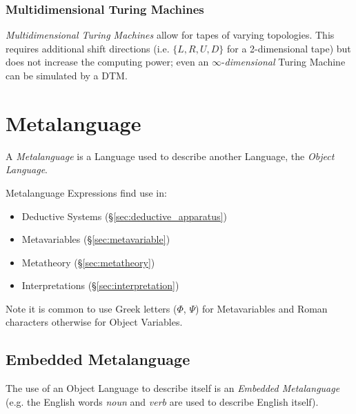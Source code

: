 \subsubsection{Multidimensional Turing Machines}

\emph{Multidimensional Turing Machines} allow for tapes of varying
topologies. This requires additional shift directions (i.e. $\{L, R, U,
D\}$ for a 2-dimensional tape) but does not increase the computing
power; even an $\infty$-\emph{dimensional} Turing Machine can be
simulated by a DTM.



\section{Metalanguage}\label{sec:metalanguage}

A \emph{Metalanguage} is a Language used to describe another Language,
the \emph{Object Language}.

Metalanguage Expressions find use in:
\begin{itemize}
    \item Deductive Systems (\S\ref{sec:deductive_apparatus})
    \item Metavariables (\S\ref{sec:metavariable})
    \item Metatheory (\S\ref{sec:metatheory})
    \item Interpretations (\S\ref{sec:interpretation})
\end{itemize}

Note it is common to use Greek letters ($\Phi$, $\Psi$) for
Metavariables and Roman characters otherwise for Object Variables.



\subsection{Embedded Metalanguage}\label{sec:embedded_metalanguage}

The use of an Object Language to describe itself is an \emph{Embedded
  Metalanguage} (e.g. the English words \emph{noun} and \emph{verb}
are used to describe English itself).



